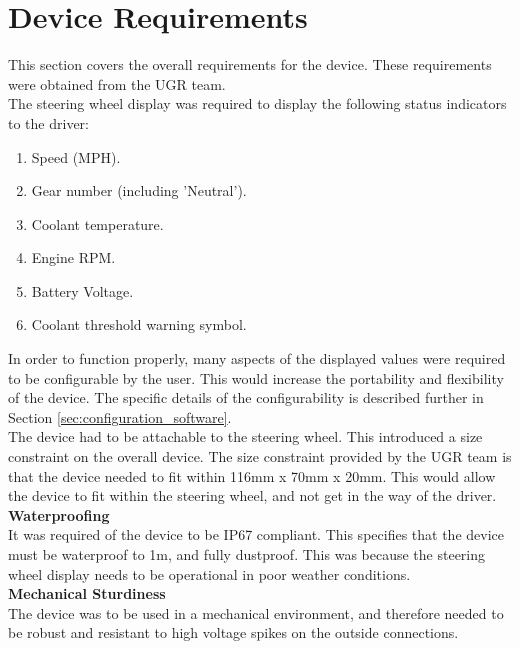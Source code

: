 \documentclass[a4paper,12pt]{article}
\begin{document}
\newpage
\section{Device Requirements}
\label{sec:device_requirements}

This section covers the overall requirements for the device. These requirements were obtained from the UGR team. \\

The steering wheel display was required to display the following status indicators to the driver:

\begin{enumerate}
  \item Speed (MPH).
  \item Gear number (including 'Neutral').
  \item Coolant temperature.
  \item Engine RPM.
  \item Battery Voltage.
  \item Coolant threshold warning symbol.
\end{enumerate}

In order to function properly, many aspects of the displayed values were required to be configurable by the user. This would increase the portability and flexibility of the device. The specific details of the configurability is described further in Section \ref{sec:configuration_software}. \\

The device had to be attachable to the steering wheel. This introduced a size constraint on the overall device. The size constraint provided by the UGR team is that the device needed to fit within 116mm x 70mm x 20mm. This would allow the device to fit within the steering wheel, and not get in the way of the driver. \\

\textbf{Waterproofing} \\

It was required of the device to be IP67 compliant. This specifies that the device must be waterproof to 1m, and fully dustproof. This was because the steering wheel display needs to be operational in poor weather conditions. \\

\textbf{Mechanical Sturdiness} \\

The device was to be used in a mechanical environment, and therefore needed to be robust and resistant to high voltage spikes on the outside connections. \\
\end{document}
